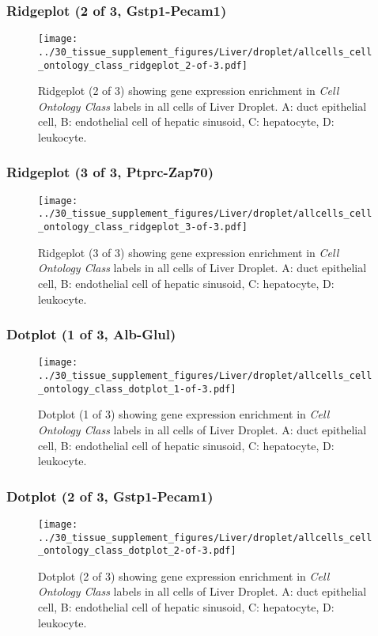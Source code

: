 \clearpage

\subsubsection{Ridgeplot (2 of 3, Gstp1-Pecam1)}
\begin{figure}[h]
\centering
\texttt{[image: ../30\_tissue\_supplement\_figures/Liver/droplet/allcells\_cell\_ontology\_class\_ridgeplot\_2-of-3.pdf]}

\caption{ Ridgeplot (2 of 3)  showing gene expression enrichment in \emph{Cell Ontology Class} labels in all cells of Liver Droplet. A: duct epithelial cell, B: endothelial cell of hepatic sinusoid, C: hepatocyte, D: leukocyte.}
\end{figure}


\clearpage

\subsubsection{Ridgeplot (3 of 3, Ptprc-Zap70)}
\begin{figure}[h]
\centering
\texttt{[image: ../30\_tissue\_supplement\_figures/Liver/droplet/allcells\_cell\_ontology\_class\_ridgeplot\_3-of-3.pdf]}

\caption{ Ridgeplot (3 of 3)  showing gene expression enrichment in \emph{Cell Ontology Class} labels in all cells of Liver Droplet. A: duct epithelial cell, B: endothelial cell of hepatic sinusoid, C: hepatocyte, D: leukocyte.}
\end{figure}


\clearpage

\subsubsection{Dotplot (1 of 3, Alb-Glul)}
\begin{figure}[h]
\centering
\texttt{[image: ../30\_tissue\_supplement\_figures/Liver/droplet/allcells\_cell\_ontology\_class\_dotplot\_1-of-3.pdf]}

\caption{ Dotplot (1 of 3)  showing gene expression enrichment in \emph{Cell Ontology Class} labels in all cells of Liver Droplet. A: duct epithelial cell, B: endothelial cell of hepatic sinusoid, C: hepatocyte, D: leukocyte.}
\end{figure}


\clearpage

\subsubsection{Dotplot (2 of 3, Gstp1-Pecam1)}
\begin{figure}[h]
\centering
\texttt{[image: ../30\_tissue\_supplement\_figures/Liver/droplet/allcells\_cell\_ontology\_class\_dotplot\_2-of-3.pdf]}

\caption{ Dotplot (2 of 3)  showing gene expression enrichment in \emph{Cell Ontology Class} labels in all cells of Liver Droplet. A: duct epithelial cell, B: endothelial cell of hepatic sinusoid, C: hepatocyte, D: leukocyte.}
\end{figure}


